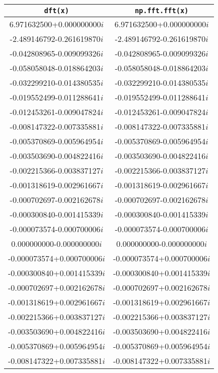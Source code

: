 \begin{table}[bth]
\centering
\begin{tabular}{cc}
\hline\hline
{\tt dft(x)} & {\tt np.fft.fft(x)} \\
\hline
6.971632500+0.000000000$i$ & 6.971632500+0.000000000$i$ \\
-2.489146792-0.261619870$i$ & -2.489146792-0.261619870$i$ \\
-0.042808965-0.009099326$i$ & -0.042808965-0.009099326$i$ \\
-0.058058048-0.018864203$i$ & -0.058058048-0.018864203$i$ \\
-0.032299210-0.014380535$i$ & -0.032299210-0.014380535$i$ \\
-0.019552499-0.011288641$i$ & -0.019552499-0.011288641$i$ \\
-0.012453261-0.009047824$i$ & -0.012453261-0.009047824$i$ \\
-0.008147322-0.007335881$i$ & -0.008147322-0.007335881$i$ \\
-0.005370869-0.005964954$i$ & -0.005370869-0.005964954$i$ \\
-0.003503690-0.004822416$i$ & -0.003503690-0.004822416$i$ \\
-0.002215366-0.003837127$i$ & -0.002215366-0.003837127$i$ \\
-0.001318619-0.002961667$i$ & -0.001318619-0.002961667$i$ \\
-0.000702697-0.002162678$i$ & -0.000702697-0.002162678$i$ \\
-0.000300840-0.001415339$i$ & -0.000300840-0.001415339$i$ \\
-0.000073574-0.000700006$i$ & -0.000073574-0.000700006$i$ \\
0.000000000-0.000000000$i$ & 0.000000000-0.000000000$i$ \\
-0.000073574+0.000700006$i$ & -0.000073574+0.000700006$i$ \\
-0.000300840+0.001415339$i$ & -0.000300840+0.001415339$i$ \\
-0.000702697+0.002162678$i$ & -0.000702697+0.002162678$i$ \\
-0.001318619+0.002961667$i$ & -0.001318619+0.002961667$i$ \\
-0.002215366+0.003837127$i$ & -0.002215366+0.003837127$i$ \\
-0.003503690+0.004822416$i$ & -0.003503690+0.004822416$i$ \\
-0.005370869+0.005964954$i$ & -0.005370869+0.005964954$i$ \\
-0.008147322+0.007335881$i$ & -0.008147322+0.007335881$i$ \\

\end{tabular}
\end{table}
